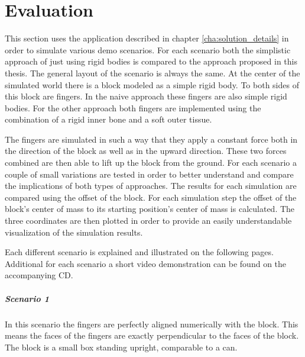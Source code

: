 \chapter{Evaluation}
\label{cha:evaluation}

This section uses the application described in chapter \ref{cha:solution_details} in order to simulate various demo scenarios. For each scenario both the simplistic approach of just using rigid bodies is compared to the approach proposed in this thesis. The general layout of the scenario is always the same. At the center of the simulated world there is a block modeled as a simple rigid body. To both sides of this block are fingers. In the naive approach these fingers are also simple rigid bodies. For the other approach both fingers are implemented using the combination of a rigid inner bone and a soft outer tissue.

The fingers are simulated in such a way that they apply a constant force both in the direction of the block as well as in the upward direction. These two forces combined are then able to lift up the block from the ground. For each scenario a couple of small variations are tested in order to better understand and compare the implications of both types of approaches. The results for each simulation are compared using the offset of the block. For each simulation step the offset of the block's center of mass to its starting position's center of mass is calculated. The three coordinates are then plotted in order to provide an easily understandable visualization of the simulation results. 

Each different scenario is explained and illustrated on the following pages. Additional for each scenario a short video demonstration can be found on the accompanying CD.

\clearpage

\paragraph{Scenario 1}
In this scenario the fingers are perfectly aligned numerically with the block. This means the faces of the fingers are exactly perpendicular to the faces of the block. The block is a small box standing upright, comparable to a can.

